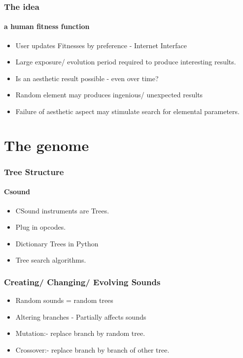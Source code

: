 \documentclass{beamer}
\begin{document}
\begin{frame}
	\frametitle{The idea}
	\framesubtitle{a human fitness function}
	\begin{itemize}
		\item<1-> User updates Fitnesses by preference - Internet Interface
		\item<2-> Large exposure/ evolution period required to produce interesting results.
     	\item<3-> Is an aesthetic result possible - even over time?
        \item<4-> Random element may produces ingenious/ unexpected results
        \item<5-> Failure of aesthetic aspect may stimulate search for elemental parameters.
	\end{itemize}
	
\end{frame}



\section{The genome} %
\begin{frame}
	\frametitle{Tree Structure}
	\framesubtitle{Csound}
	\begin{itemize}
	\item<1-> CSound instruments are Trees.
	\item<3-> Plug in opcodes.
	\item<4-> Dictionary Trees in Python
	\item<5-> Tree search algorithms.	
\end{itemize}

	
\end{frame}

\begin{frame}
	\frametitle{Creating/ Changing/ Evolving Sounds}
	\begin{itemize}
	\item<1-> Random sounds = random trees
	\item<2-> Altering branches - Partially affects sounds
	\item<3-> Mutation:- replace branch by random tree.
	\item<4-> Crossover:- replace branch by branch of other tree.		
\end{itemize}

\end{frame}

\label{sg:sec:the_genome}
\end{document}
